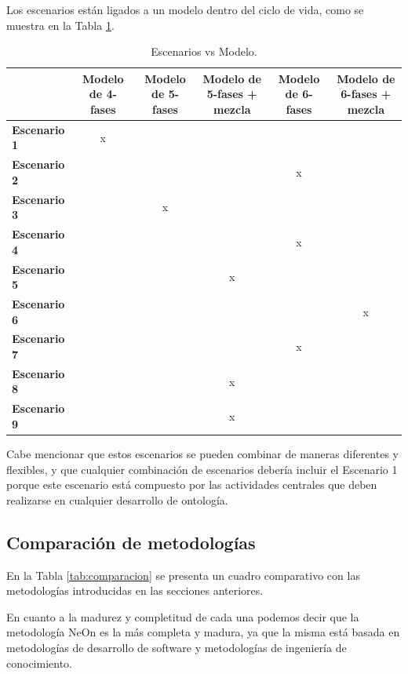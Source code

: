 Los escenarios están ligados a un modelo dentro del ciclo de vida, como se muestra en la Tabla \ref{escenarios vs modelo}.

\begin{table}[!htb]
\centering
\caption{Escenarios vs Modelo.\cite{Corcho2003BuildingLO}}
\label{escenarios vs modelo}
\resizebox{15cm}{!} {
\begin{tabular}{|l|c|c|c|c|c|}
\hline
 & \multicolumn{1}{m{2cm}|}{\textbf{Modelo de 4-fases}} & \multicolumn{1}{m{2cm}}{\textbf{Modelo de 5-fases}} & \multicolumn{1}{|m{2cm}|}{\textbf{Modelo de 5-fases + mezcla}} & \multicolumn{1}{m{2cm}}{\textbf{Modelo de 6-fases}} & \multicolumn{1}{|m{2cm}|}{\textbf{Modelo de 6-fases + mezcla}} \\ \hline
 \textbf{Escenario 1} & x & & & & \\ \hline
 \textbf{Escenario 2} & & & & x & \\ \hline
 \textbf{Escenario 3} & & x & & & \\ \hline
 \textbf{Escenario 4} & & & & x & \\ \hline
 \textbf{Escenario 5} & & & x & & \\ \hline
 \textbf{Escenario 6} & & & & & x \\ \hline
 \textbf{Escenario 7} & & & & x & \\ \hline
 \textbf{Escenario 8} & & & x & & \\ \hline
 \textbf{Escenario 9} & & & x & & \\ \hline
\end{tabular}
}
\end{table}


Cabe mencionar que estos escenarios se pueden combinar de maneras diferentes y flexibles, y que cualquier combinación de escenarios debería incluir el Escenario 1 porque este escenario está compuesto por las actividades centrales que deben realizarse en cualquier desarrollo de ontología.  

\subsection{Comparación de metodologías}
En la Tabla \ref{tab:comparacion} se presenta un cuadro comparativo con las metodologías introducidas en las secciones anteriores. 

En cuanto a la madurez y completitud de cada una podemos decir que la metodología NeOn es la más completa y madura, ya que la misma está basada en metodologías de desarrollo de software y metodologías de ingeniería de conocimiento.


